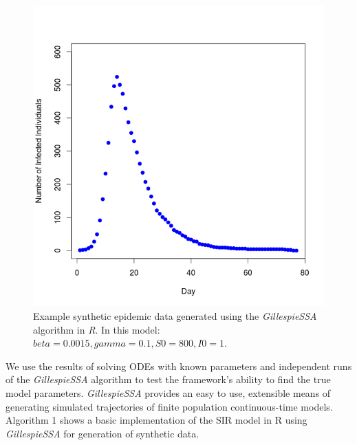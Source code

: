 \begin{center}
\begin{figure}[ht!]

\includegraphics[width=15cm]{simplesir.png}
\caption{Example synthetic epidemic data generated using the
  \emph{GillespieSSA} algorithm in \emph{R}. In this model: $beta =
  0.0015, gamma = 0.1, S0 = 800, I0 = 1$.}
\end{figure}  
\end{center}

We use the results of solving ODEs with known parameters and
independent runs of the \emph{GillespieSSA} algorithm to test the
framework's ability to find the true model
parameters. \emph{GillespieSSA} provides an easy to use, extensible
means of generating simulated trajectories of finite population
continuous-time models. Algorithm 1 shows a basic implementation of the
SIR model in R using \emph{GillespieSSA} for generation of synthetic data.

